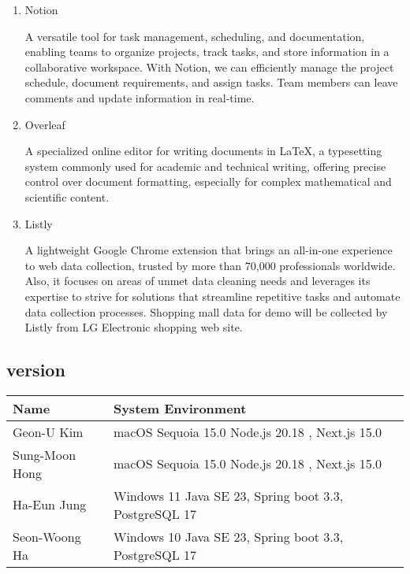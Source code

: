 \documentclass[conference]{IEEEtran}
\begin{document}
\begin{enumerate}
\item Notion

A versatile tool for task management, scheduling, and documentation, enabling teams to organize projects, track tasks, and store information in a collaborative workspace. With Notion, we can efficiently manage the project schedule, document requirements, and assign tasks. Team members can leave comments and update information in real-time.

\item Overleaf

A specialized online editor for writing documents in LaTeX, a typesetting system commonly used for academic and technical writing, offering precise control over document formatting, especially for complex mathematical and scientific content.

\item Listly

A lightweight Google Chrome extension that brings an all-in-one experience to web data collection, trusted by more than 70,000 professionals worldwide. Also, it focuses on areas of unmet data cleaning needs and leverages its expertise to strive for solutions that streamline repetitive tasks and automate data collection processes.  Shopping mall data for demo will be collected by Listly from LG Electronic shopping web site.

\end{enumerate}

\subsection{version}
\begin{table}[H] 
\renewcommand\arraystretch{1.25}
\centering 
\begin{threeparttable}
    \scriptsize
    \begin{tabular}{@{}p{3cm} p{5.3cm}@{}}
    \toprule
    \bfseries Name & \bfseries System Environment \\ 
    \midrule
    Geon-U Kim & macOS Sequoia 15.0 \newline Node.js 20.18 , Next.js 15.0\\ 
    Sung-Moon Hong & macOS Sequoia 15.0 \newline Node.js 20.18 , Next.js 15.0\\ 
    Ha-Eun Jung & Windows 11 \newline Java SE 23, Spring boot 3.3, PostgreSQL 17\\ 
    Seon-Woong Ha & Windows 10 \newline Java SE 23, Spring boot 3.3, PostgreSQL 17\\ 
    \bottomrule
    \end{tabular}
\end{threeparttable}
\end{table}
\end{document}
